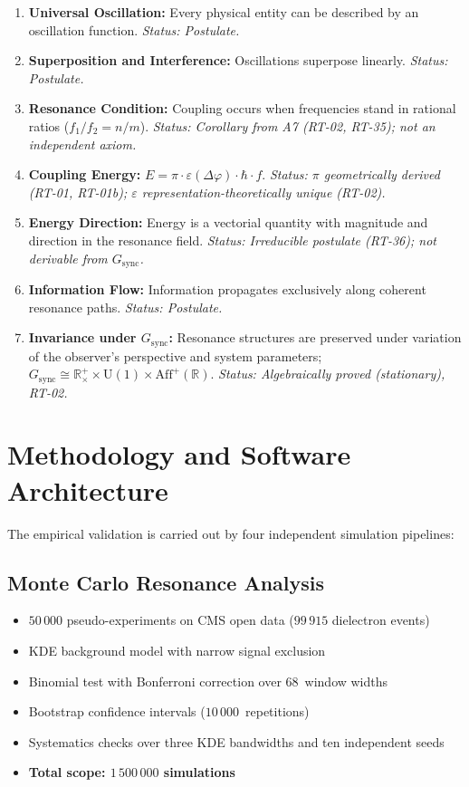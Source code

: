 \documentclass[a4paper,11pt]{article}
\begin{document}
	\begin{enumerate}
		\item[A1] \textbf{Universal Oscillation:}
		Every physical entity can be described by an
		oscillation function.
		\textit{Status: Postulate.}
		\item[A2] \textbf{Superposition and Interference:}
		Oscillations superpose linearly.
		\textit{Status: Postulate.}
		\item[A3] \textbf{Resonance Condition:}
		Coupling occurs when frequencies stand in rational
		ratios ($f_1/f_2 = n/m$).
		\textit{Status: Corollary from A7 (RT-02, RT-35);
		not an independent axiom.}
		\item[A4] \textbf{Coupling Energy:}
		$E = \pi \cdot \varepsilon(\Delta\varphi)
		\cdot \hbar \cdot f$.
		\textit{Status: $\pi$ geometrically derived (RT-01, RT-01b);
		$\varepsilon$ representation-theoretically unique (RT-02).}
		\item[A5] \textbf{Energy Direction:}
		Energy is a vectorial quantity with magnitude
		and direction in the resonance field.
		\textit{Status: Irreducible postulate (RT-36);
		not derivable from $G_{\mathrm{sync}}$.}
		\item[A6] \textbf{Information Flow:}
		Information propagates exclusively along
		coherent resonance paths.
		\textit{Status: Postulate.}
		\item[A7] \textbf{Invariance under $G_{\mathrm{sync}}$:}
		Resonance structures are preserved under variation of
		the observer's perspective and system parameters;
		$G_{\mathrm{sync}} \cong \mathbb{R}^+_\times \times \mathrm{U}(1)
		\times \mathrm{Aff}^+(\mathbb{R})$.
		\textit{Status: Algebraically proved (stationary), RT-02.}
	\end{enumerate}
	
	\section{Methodology and Software Architecture}
	
	The empirical validation is carried out by four independent
	simulation pipelines:
	
	\subsection{Monte Carlo Resonance Analysis}
	
	\begin{itemize}
		\item $50\,000$ pseudo-experiments on CMS open data
		($99\,915$ dielectron events)
		\item KDE background model with narrow signal exclusion
		\item Binomial test with Bonferroni correction over
		68~window widths
		\item Bootstrap confidence intervals
		($10\,000$~repetitions)
		\item Systematics checks over three KDE bandwidths
		and ten independent seeds
		\item \textbf{Total scope: $1\,500\,000$ simulations}
	\end{itemize}
	
\end{document}
